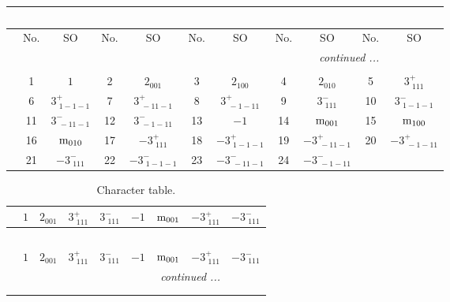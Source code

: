 \documentclass[fleqn,10pt,landscape]{article}
\begin{document}
\begin{itemize}
\begin{center}
\begin{longtable}{c|cc|cc|cc|cc|cc}
\multicolumn{10}{l}{\tablename\ \thetable{}} \\
 \hline \hline
 & No. & SO & No. & SO & No. & SO & No. & SO & No. & SO \\ \hline \endhead

 \hline \hline
\multicolumn{10}{r}{\footnotesize\it continued ...} \\ \endfoot

 \hline \hline
\multicolumn{10}{r}{} \\ \endlastfoot

 & 1 & $1$ & 2 & $2{}_{001}$ & 3 & $2{}_{100}$ & 4 & $2{}_{010}$ & 5 & $3^{+}_{\,\,111}$ \\
& 6 & $3^{+}_{\,\,1-1-1}$ & 7 & $3^{+}_{\,\,-11-1}$ & 8 & $3^{+}_{\,\,-1-11}$ & 9 & $3^{-}_{\,\,111}$ & 10 & $3^{-}_{\,\,1-1-1}$ \\
& 11 & $3^{-}_{\,\,-11-1}$ & 12 & $3^{-}_{\,\,-1-11}$ & 13 & $-1$ & 14 & ${\rm m}_{001}$ & 15 & ${\rm m}_{100}$ \\
& 16 & ${\rm m}_{010}$ & 17 & $-3^{+}_{\,\,111}$ & 18 & $-3^{+}_{\,\,1-1-1}$ & 19 & $-3^{+}_{\,\,-11-1}$ & 20 & $-3^{+}_{\,\,-1-11}$ \\
& 21 & $-3^{-}_{\,\,111}$ & 22 & $-3^{-}_{\,\,1-1-1}$ & 23 & $-3^{-}_{\,\,-11-1}$ & 24 & $-3^{-}_{\,\,-1-11}$ &  &  \\
\end{longtable}
\end{center}
\begin{center}
\renewcommand{\arraystretch}{1.0}
\begin{longtable}{c|rrrrrrrr}
\caption{Character table.}
 \\
 \hline \hline
 & $ 1 $ & $ 2{}_{001} $ & $ 3^{+}_{\,\,111} $ & $ 3^{-}_{\,\,111} $ & $ -1 $ & $ {\rm m}_{001} $ & $ -3^{+}_{\,\,111} $ & $ -3^{-}_{\,\,111} $ \\ \hline \endfirsthead

\multicolumn{8}{l}{\tablename\ \thetable{}} \\
 \hline \hline
 & $ 1 $ & $ 2{}_{001} $ & $ 3^{+}_{\,\,111} $ & $ 3^{-}_{\,\,111} $ & $ -1 $ & $ {\rm m}_{001} $ & $ -3^{+}_{\,\,111} $ & $ -3^{-}_{\,\,111} $ \\ \hline \endhead

 \hline \hline
\multicolumn{8}{r}{\footnotesize\it continued ...} \\ \endfoot

 \hline \hline
\multicolumn{8}{r}{} \\ \endlastfoot


\end{longtable}
\end{center}
\end{itemize}
\end{document}
